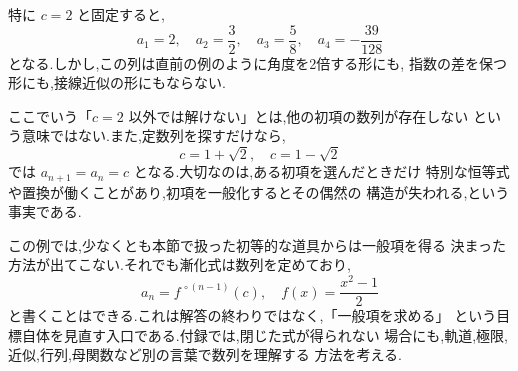 特に $c=2$ と固定すると,
\[
  a_1=2,
  \quad
  a_2=\frac{3}{2},
  \quad
  a_3=\frac{5}{8},
  \quad
  a_4=-\frac{39}{128}
\]
となる.しかし,この列は直前の例のように角度を2倍する形にも,
指数の差を保つ形にも,接線近似の形にもならない.

ここでいう「$c=2$ 以外では解けない」とは,他の初項の数列が存在しない
という意味ではない.また,定数列を探すだけなら,
\[
  c=1+\sqrt{2},
  \quad
  c=1-\sqrt{2}
\]
では $a_{n+1}=a_n=c$ となる.大切なのは,ある初項を選んだときだけ
特別な恒等式や置換が働くことがあり,初項を一般化するとその偶然の
構造が失われる,という事実である.

この例では,少なくとも本節で扱った初等的な道具からは一般項を得る
決まった方法が出てこない.それでも漸化式は数列を定めており,
\[
  a_n=f^{\,\circ(n-1)}(c),
  \quad
  f(x)=\frac{x^2-1}{2}
\]
と書くことはできる.これは解答の終わりではなく,「一般項を求める」
という目標自体を見直す入口である.付録では,閉じた式が得られない
場合にも,軌道,極限,近似,行列,母関数など別の言葉で数列を理解する
方法を考える.
